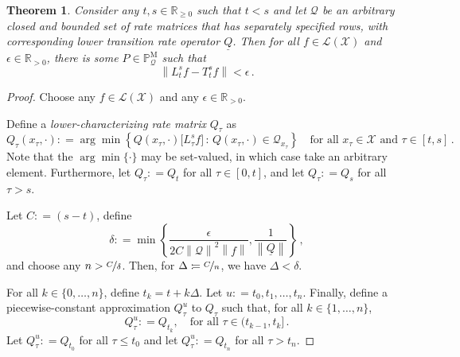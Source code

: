 \documentclass[10pt]{paper}
\newtheorem{theorem}{Theorem}
\newcommand{\reals}{\mathbb{R}}
\newcommand{\realspos}{\reals_{>0}}
\newcommand{\realsnonneg}{\reals_{\geq 0}}
\newcommand{\states}{\mathcal{X}}
\newcommand{\processes}{\mathbb{P}}
\newcommand{\mprocesses}{\processes^{\mathrm{M}}}
\newcommand{\lbound}{L}
\newcommand{\gambles}{\mathcal{L}}
\newcommand{\gamblesX}{\gambles(\states)}
\newcommand{\rateset}{\mathcal{Q}}
\newcommand{\lrate}{\underline{Q}}
\newcommand{\norm}[1]{\left\lVert #1 \right\rVert}
\newcommand{\coloneqq}{:\!=}
\newcommand{\argmin}{\arg\min}
\begin{document}
\begin{theorem}\label{theorem:lower_markov_bound_is_tight}
Consider any $t,s\in\realsnonneg$ such that $t<s$ and let $\rateset$ be an arbitrary closed and bounded set of rate matrices that has separately specified rows, with corresponding lower transition rate operator $\lrate$. Then for all $f\in\gamblesX$ and $\epsilon\in\realspos$, there is some $P\in\mprocesses_{\rateset}$ such that
\begin{equation*}
\norm{\lbound_t^sf-T_t^sf} < \epsilon\,.
\end{equation*}
\end{theorem}
\begin{proof}
Choose any $f\in\gamblesX$ and any $\epsilon\in\realspos$.

Define a \emph{lower-characterizing rate matrix} $Q_\tau$ as
\begin{equation}\label{eq:lower_char_rate_matrix}
Q_\tau(x_\tau,\cdot)\coloneqq \argmin\left\{ Q(x_\tau,\cdot)\bigl[\lbound_\tau^sf\bigr]\,:\,Q(x_\tau,\cdot)\in\mathcal{Q}_{x_\tau}\right\}\quad\text{for all $x_\tau\in\states$ and $\tau\in[t,s]$}\,.
\end{equation}
Note that the $\argmin\{\cdot\}$ may be set-valued, in which case take an arbitrary element.
Furthermore, let $Q_\tau \coloneqq Q_t$ for all $\tau\in[0,t]$, and let $Q_\tau\coloneqq Q_s$ for all $\tau>s$.

Let $C\coloneqq (s-t)$, define
\begin{equation}\label{eq:delta_required_for_tight_bound}
\delta \coloneqq \min\left\{\frac{\epsilon}{2C\norm{\mathcal{Q}}^2\norm{f}},\frac{1}{\norm{\lrate}}\right\}\,,
\end{equation}
and choose any $n>\nicefrac{C}{\delta}$. Then, for $\Delta\coloneqq \nicefrac{C}{n}$, we have $\Delta<\delta$.

For all $k\in\{0,\ldots,n\}$, define $t_k=t+k\Delta$. Let $u\coloneqq t_0,t_1,\ldots,t_n$. Finally, define a piecewise-constant approximation $Q_\tau^u$ to $Q_\tau$ such that, for all $k\in\{1,\ldots,n\}$,
\begin{equation}\label{eq:lower_char_matrix_linear_approx}
Q_\tau^u \coloneqq Q_{t_k},\quad\text{for all $\tau\in (t_{k-1},t_k]$}\,.
\end{equation}
Let $Q_\tau^u\coloneqq Q_{t_0}$ for all $\tau\leq t_0$ and let $Q_\tau^u\coloneqq Q_{t_n}$ for all $\tau>t_n$.


\end{proof}
\end{document}
